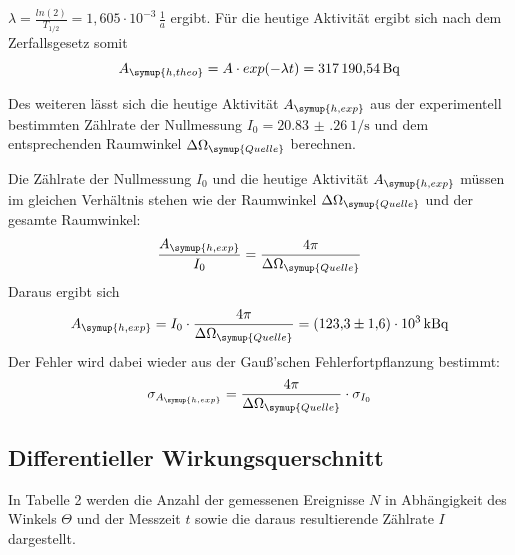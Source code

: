 $\lambda = \frac{ln(2)}{T_{1/2}} = 1,605 \cdot 10^{-3} \, \frac{1}{a}$ ergibt.
Für die heutige Aktivität ergibt sich nach dem Zerfallsgesetz somit
\begin{equation*}
  A_{\symup{h,theo}} = A \cdot exp(-\lambda t) = \SI{317190.54}{\becquerel}
\end{equation*}

Des weiteren lässt sich die heutige Aktivität $A_{\symup{h,exp}}$ aus der experimentell bestimmten
Zählrate der Nullmessung $I_0 = \SI{20.83(26)}{1\per\second}$ und dem entsprechenden Raumwinkel $\Delta \Omega_{\symup{Quelle}}$ berechnen.

Die Zählrate der Nullmessung $I_0$ und die heutige Aktivität $A_\symup{h,exp}$ müssen im gleichen
Verhältnis stehen wie der Raumwinkel $\Delta \Omega_{\symup{Quelle}}$ und der gesamte Raumwinkel:
\begin{equation*}
  \frac{A_\symup{h,exp}}{I_0} = \frac{4\pi}{\Delta \Omega_{\symup{Quelle}}}
\end{equation*}
Daraus ergibt sich
\begin{equation*}
  A_\symup{h,exp} = I_0 \cdot \frac{4\pi}{\Delta \Omega_{\symup{Quelle}}} = \SI{123.3(16)e3}{\kilo\becquerel}
\end{equation*}
Der Fehler wird dabei wieder aus der Gauß'schen Fehlerfortpflanzung bestimmt:
\begin{equation*}
  \sigma_{A_\symup{h,exp}} = \frac{4\pi}{\Delta \Omega_{\symup{Quelle}}} \cdot \sigma_{I_0}
\end{equation*}



\subsection{Differentieller Wirkungsquerschnitt}
\label{sec:wq}
In Tabelle 2 werden die Anzahl der gemessenen Ereignisse $N$ in Abhängigkeit des Winkels $\Theta$ und der Messzeit $t$
sowie die daraus resultierende Zählrate $I$ dargestellt.


